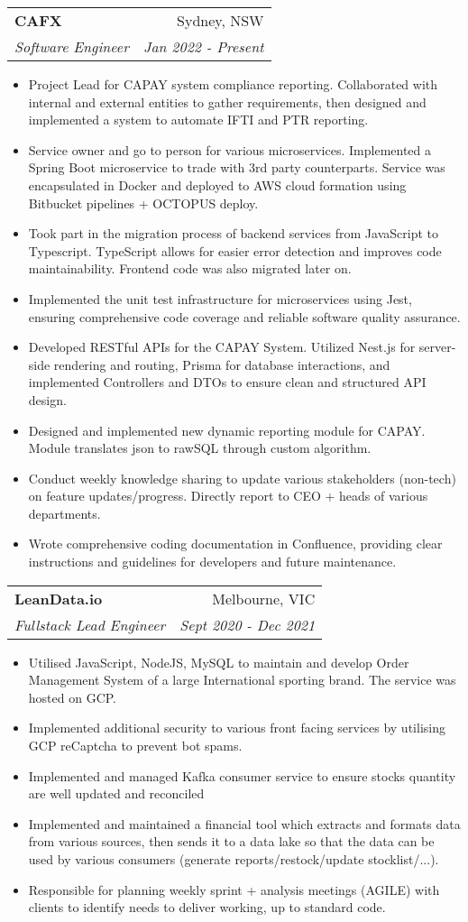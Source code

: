 \documentclass[letterpaper,11pt]{article}
\makeatletter
\newcommand{\resumeSubheading}[4]{
  \vspace{-1pt}\item
    \begin{tabular*}{0.97\textwidth}{l@{\extracolsep{\fill}}r}
      \textbf{#1} & #2 \\
      \textit{\small#3} & \textit{\small #4} \\
    \end{tabular*}\vspace{-5pt}
}
\newcommand{\resumeSingleItem}[1]{\item\small{{#1}\vspace{-2pt}}}
\newcommand{\resumeItemListStart}{\begin{itemize}[label={\textcolor{black}{$\bullet$}}]}
\newcommand{\resumeItemListEnd}{\end{itemize}\vspace{-5pt}}
\makeatother
\begin{document}
\resumeSubheading
{CAFX}{Sydney, NSW}
{Software Engineer}{Jan 2022 - Present}
\resumeItemListStart
\resumeSingleItem{Project Lead for CAPAY system compliance reporting. Collaborated with internal and external entities to gather requirements, then designed and implemented a system to automate IFTI and PTR reporting.}
\resumeSingleItem{Service owner and go to person for various microservices. Implemented a Spring Boot microservice to trade with 3rd party counterparts. Service was encapsulated in Docker and deployed to AWS cloud formation using Bitbucket pipelines + OCTOPUS deploy.}
\resumeSingleItem{Took part in the migration process of backend services from JavaScript to Typescript. TypeScript allows for easier error detection and improves code maintainability. Frontend code was also migrated later on.}
\resumeSingleItem{Implemented the unit test infrastructure for microservices using Jest, ensuring comprehensive code coverage and reliable software quality assurance.}
\resumeSingleItem{Developed RESTful APIs for the CAPAY System. Utilized Nest.js for server-side rendering and routing, Prisma for database interactions, and implemented Controllers and DTOs to ensure clean and structured API design.}
\resumeSingleItem{Designed and implemented new dynamic reporting module for CAPAY. Module translates json to rawSQL through custom algorithm.}
\resumeSingleItem{Conduct weekly knowledge sharing to update various stakeholders (non-tech) on feature updates/progress. Directly report to CEO + heads of various departments.}
\resumeSingleItem{Wrote comprehensive coding documentation in Confluence, providing clear instructions and guidelines for developers and future maintenance.}
\resumeItemListEnd

\resumeSubheading
{LeanData.io}{Melbourne, VIC}
{Fullstack Lead Engineer}{Sept 2020 - Dec 2021}
\resumeItemListStart
\resumeSingleItem{Utilised JavaScript, NodeJS, MySQL to maintain and develop Order Management System of a large International sporting brand. The service was hosted on GCP.}
\resumeSingleItem{Implemented additional security to various front facing services by utilising GCP reCaptcha to prevent bot spams.}
\resumeSingleItem{Implemented and managed Kafka consumer service to ensure stocks quantity are well updated and reconciled}
\resumeSingleItem{Implemented and maintained a financial tool which extracts and formats data from various sources, then sends it to a data lake so that the data can be used by various consumers (generate reports/restock/update stocklist/...).}
\resumeSingleItem{Responsible for planning weekly sprint + analysis meetings (AGILE) with clients to identify needs to deliver working, up to standard code.}
\resumeItemListEnd
\end{document}
